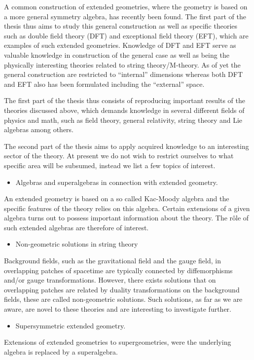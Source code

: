 \documentclass{article}
\begin{document}
A common construction of extended geometries, where the geometry is based on a more general symmetry algebra, has recently been found. The first part of the thesis thus aims to study this general construction as well as specific theories such as double field theory (DFT) and exceptional field theory (EFT), which are examples of such extended geometries. Knowledge of DFT and EFT serve as valuable knowledge in construction of the general case as well as being the physically interesting theories related to string theory/M-theory. As of yet the general construction are restricted to ``internal'' dimensions whereas both DFT and EFT also has been formulated including the ``external'' space. 

The first part of the thesis thus consists of reproducing important results of the theories discussed above, which demands knowledge in several different fields of physics and math, such as field theory, general relativity, string theory and Lie algebras among others.  

The second part of the thesis aims to apply acquired knowledge to an interesting sector of the theory. At present we do not wish to restrict ourselves to what specific area will be subsumed, instead we list a few topics of interest.

\begin{itemize}
    \item Algebras and superalgebras in connection with extended geometry.
\end{itemize}
An extended geometry is based on a so called Kac-Moody algebra and the specific features of the theory relies on this algebra. Certain extensions of a given algebra turns out to possess important information about the theory. The rôle of such extended algebras are therefore of interest.

\begin{itemize}
    \item Non-geometric solutions in string theory
\end{itemize}
Background fields, such as the gravitational field and the gauge field, in overlapping patches of spacetime are typically connected by diffemorphisms and/or gauge transformations. However, there exists solutions that on overlapping patches are related by duality transformations on the background fields, these are called non-geometric solutions. Such solutions, as far as we are aware, are novel to these theories and are interesting to investigate further. 

\begin{itemize}
    \item Supersymmetric extended geometry.
\end{itemize}
Extensions of extended geometries to supergeometries, were the underlying algebra is replaced by a superalgebra.
\end{document}
